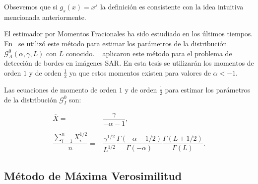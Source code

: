 Obsevemos que si $g_s(x)=x^s$ la definición es consistente con la idea intuitiva mencionada anteriormente.
%

El estimador por Momentos Fracionales ha sido estudiado en los últimos tiempos. En~\citet{Frery97} se utilizó este método para estimar los parámetros de la distribución $\mathcal{G}_A^0(\alpha,\gamma,L)$ con $L$ conocido. ~\citet{GambiniSC08} aplicaron este método para el problema de detección de bordes en imágenes SAR. En esta tesis se utilizarán los momentos de orden $1$ y de orden $\frac{1}{2}$ ya que estos momentos existen para valores de $\alpha<-1$.

Las ecuaciones de momento de orden $1$ y de orden $\frac{1}{2}$ para estimar los parámetros de la distribución $\mathcal G_I^0$ son:

\begin{align}
\label{momento1medio}
\nonumber \overline{X}=&\dfrac{\gamma}{-\alpha - 1}, \\
\nonumber \\ 
\dfrac{\sum_{i=1}^n X_i^{1/2}}{n}=&\dfrac{\gamma^{1/2}}{L^{1/2}}\dfrac{\Gamma(-\alpha - 1/2)}{\Gamma(-\alpha)}\dfrac{\Gamma(L+ 1/2)}{\Gamma(L)}.
\end{align}


\subsection{Método de Máxima Verosimilitud}
\label{MetodoMV}


